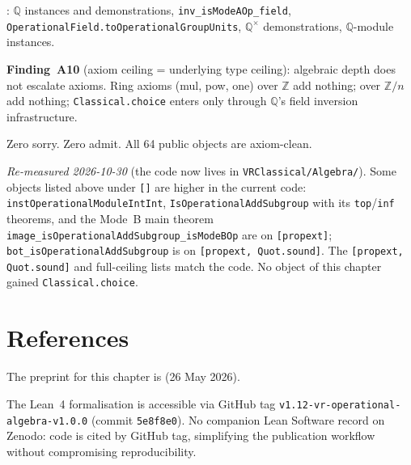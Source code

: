 :
$\mathbb{Q}$ instances and demonstrations, \texttt{inv\_isModeAOp\_field},
\texttt{OperationalField.toOperationalGroupUnits},
$\mathbb{Q}^\times$ demonstrations, $\mathbb{Q}$-module instances.

\textbf{Finding~A10} (axiom ceiling = underlying type ceiling):
algebraic depth does not escalate axioms.
Ring axioms (mul, pow, one) over $\mathbb{Z}$ add nothing; over $\mathbb{Z}/n$
add nothing; \texttt{Classical.choice} enters only through $\mathbb{Q}$'s
field inversion infrastructure.

Zero sorry.  Zero admit.  All 64 public objects are axiom-clean.

\emph{Re-measured 2026-10-30} (the code now lives in \texttt{VRClassical/Algebra/}).
Some objects listed above under \texttt{[]} are higher in the current code:
\texttt{instOperationalModuleIntInt}, \texttt{IsOperationalAddSubgroup} with its
\texttt{top}/\texttt{inf} theorems, and the Mode~B main theorem
\texttt{image\_isOperationalAddSubgroup\_isModeBOp} are on \texttt{[propext]};
\texttt{bot\_isOperationalAddSubgroup} is on \texttt{[propext, Quot.sound]}.  The
\texttt{[propext, Quot.sound]} and full-ceiling lists match the code.  No object of this
chapter gained \texttt{Classical.choice}.

\section{References}
\label{sec:algebra_refs}

The preprint for this chapter is
 (26 May 2026).

The Lean~4 formalisation is accessible via GitHub tag
\texttt{v1.12-vr-operational-algebra-v1.0.0} (commit \texttt{5e8f8e0}).
No companion Lean Software record on Zenodo: code is cited by GitHub tag,
simplifying the publication workflow without compromising reproducibility.
